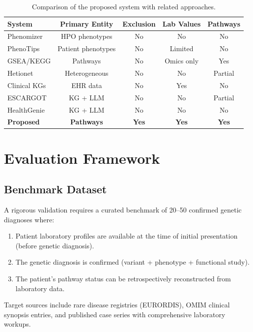 \documentclass[12pt,a4paper]{article}
\begin{document}
\begin{table}[H]
\centering
\caption{Comparison of the proposed system with related approaches.}
\label{tab:comparison}
\begin{tabular}{lcccc}
\toprule
\textbf{System} & \textbf{Primary Entity} & \textbf{Exclusion} & \textbf{Lab Values} & \textbf{Pathways} \\
\midrule
Phenomizer & HPO phenotypes & No & No & No \\
PhenoTips & Patient phenotypes & No & Limited & No \\
GSEA/KEGG & Pathways & No & Omics only & Yes \\
Hetionet & Heterogeneous & No & No & Partial \\
Clinical KGs & EHR data & No & Yes & No \\
ESCARGOT & KG + LLM & No & No & Partial \\
HealthGenie & KG + LLM & No & No & No \\
\textbf{Proposed} & \textbf{Pathways} & \textbf{Yes} & \textbf{Yes} & \textbf{Yes} \\
\bottomrule
\end{tabular}
\end{table}

\section{Evaluation Framework}
\label{sec:evaluation}

\subsection{Benchmark Dataset}

A rigorous validation requires a curated benchmark of 20--50 confirmed genetic diagnoses where:
\begin{enumerate}
    \item Patient laboratory profiles are available at the time of initial presentation (before genetic diagnosis).
    \item The genetic diagnosis is confirmed (variant + phenotype + functional study).
    \item The patient's pathway status can be retrospectively reconstructed from laboratory data.
\end{enumerate}

Target sources include rare disease registries (EURORDIS), OMIM clinical synopsis entries, and published case series with comprehensive laboratory workups.
\end{document}
